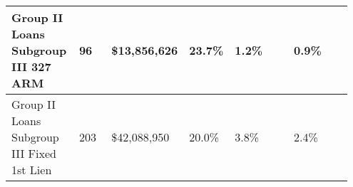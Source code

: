 \begin{longtable}{|p{0.2\linewidth}|p{0.1\linewidth}|p{0.15\linewidth}|p{0.1\linewidth}|p{0.2\linewidth}|p{0.2\linewidth}|}
\hline
Group II Loans Subgroup III 327 ARM        &                           96 &                    \$13,856,626 &                              23.7\% &                          1.2\% &                                               0.9\% \\
\hline
Group II Loans Subgroup III Fixed 1st Lien &                          203 &                    \$42,088,950 &                              20.0\% &                          3.8\% &                                               2.4\% \\
\hline
\end{longtable}
